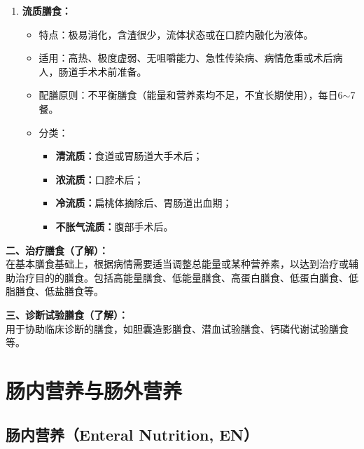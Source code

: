 \begin{tipbox}
\begin{enumerate}[leftmargin=*]
    \item \textbf{流质膳食：}
    \begin{itemize}[leftmargin=*]
        \item 特点：极易消化，含渣很少，流体状态或在口腔内融化为液体。
        \item 适用：高热、极度虚弱、无咀嚼能力、急性传染病、病情危重或术后病人，肠道手术术前准备。
        \item 配膳原则：不平衡膳食（能量和营养素均不足，不宜长期使用），每日6$\sim$7餐。
        \item 分类：
        \begin{itemize}[leftmargin=*]
            \item \textbf{清流质：}食道或胃肠道大手术后；
            \item \textbf{浓流质：}口腔术后；
            \item \textbf{冷流质：}扁桃体摘除后、胃肠道出血期；
            \item \textbf{不胀气流质：}腹部手术后。
        \end{itemize}
    \end{itemize}
\end{enumerate}

\textbf{二、治疗膳食（了解）：}\\
在基本膳食基础上，根据病情需要适当调整总能量或某种营养素，以达到治疗或辅助治疗目的的膳食。包括高能量膳食、低能量膳食、高蛋白膳食、低蛋白膳食、低脂膳食、低盐膳食等。

\textbf{三、诊断试验膳食（了解）：}\\
用于协助临床诊断的膳食，如胆囊造影膳食、潜血试验膳食、钙磷代谢试验膳食等。
\end{tipbox}

\section{肠内营养与肠外营养}

\subsection{肠内营养（Enteral Nutrition, EN）}

